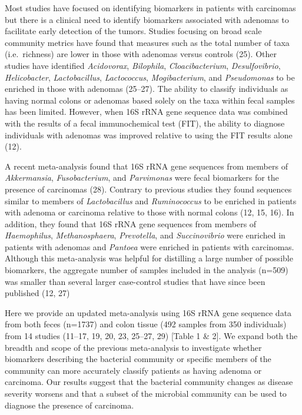 \documentclass[12pt,]{article}
\begin{document}
Most studies have focused on identifying biomarkers in patients with
carcinomas but there is a clinical need to identify biomarkers
associated with adenomas to facilitate early detection of the tumors.
Studies focusing on broad scale community metrics have found that
measures such as the total number of taxa (i.e.~richness) are lower in
those with adenomas versus controls (25). Other studies have identified
\emph{Acidovorax}, \emph{Bilophila}, \emph{Cloacibacterium},
\emph{Desulfovibrio}, \emph{Helicobacter}, \emph{Lactobacillus},
\emph{Lactococcus}, \emph{Mogibacterium}, and \emph{Pseudomonas} to be
enriched in those with adenomas (25--27). The ability to classify
individuals as having normal colons or adenomas based solely on the taxa
within fecal samples has been limited. However, when 16S rRNA gene
sequence data was combined with the results of a fecal immunochemical
test (FIT), the ability to diagnose individuals with adenomas was
improved relative to using the FIT results alone (12).

A recent meta-analysis found that 16S rRNA gene sequences from members
of \emph{Akkermansia}, \emph{Fusobacterium}, and \emph{Parvimonas} were
fecal biomarkers for the presence of carcinomas (28). Contrary to
previous studies they found sequences similar to members of
\emph{Lactobacillus} and \emph{Ruminococcus} to be enriched in patients
with adenoma or carcinoma relative to those with normal colons (12, 15,
16). In addition, they found that 16S rRNA gene sequences from members
of \emph{Haemophilus}, \emph{Methanosphaera}, \emph{Prevotella}, and
\emph{Succinovibrio} were enriched in patients with adenomas and
\emph{Pantoea} were enriched in patients with carcinomas. Although this
meta-analysis was helpful for distilling a large number of possible
biomarkers, the aggregate number of samples included in the analysis
(n=509) was smaller than several larger case-control studies that have
since been published (12, 27)

Here we provide an updated meta-analysis using 16S rRNA gene sequence
data from both feces (n=1737) and colon tissue (492 samples from 350
individuals) from 14 studies (11--17, 19, 20, 23, 25--27, 29) {[}Table 1
\& 2{]}. We expand both the breadth and scope of the previous
meta-analysis to investigate whether biomarkers describing the bacterial
community or specific members of the community can more accurately
classify patients as having adenoma or carcinoma. Our results suggest
that the bacterial community changes as disease severity worsens and
that a subset of the microbial community can be used to diagnose the
presence of carcinoma.
\end{document}
